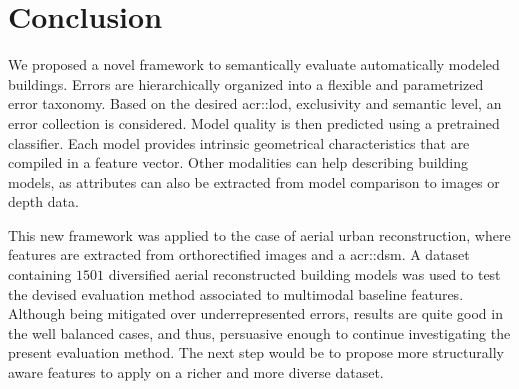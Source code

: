 \documentclass[runningheads]{llncs}
\begin{document}
\begin{figure}
\begin{center}
	\end{center}
\end{figure}

\section{Conclusion}

We proposed a novel framework to semantically evaluate automatically modeled buildings. Errors are hierarchically organized into a flexible and parametrized error taxonomy. Based on the desired \acrshort{acr::lod}, exclusivity and semantic level, an error collection is considered. Model quality is then predicted using a pretrained classifier. Each model provides intrinsic geometrical characteristics that are compiled in a feature vector. Other modalities can help describing building models, as attributes can also be extracted from model comparison to images or depth data.

This new framework was applied to the case of aerial urban reconstruction, where features are extracted from orthorectified images and a \acrshort{acr::dsm}. A dataset containing $1501$ diversified aerial reconstructed building models was used to test the devised evaluation method associated to multimodal baseline features. Although being mitigated over underrepresented errors, results are quite good in the well balanced cases, and thus, persuasive enough to continue investigating the present evaluation method. The next step would be to propose more structurally aware features to apply on a richer and more diverse dataset.


\end{document}
